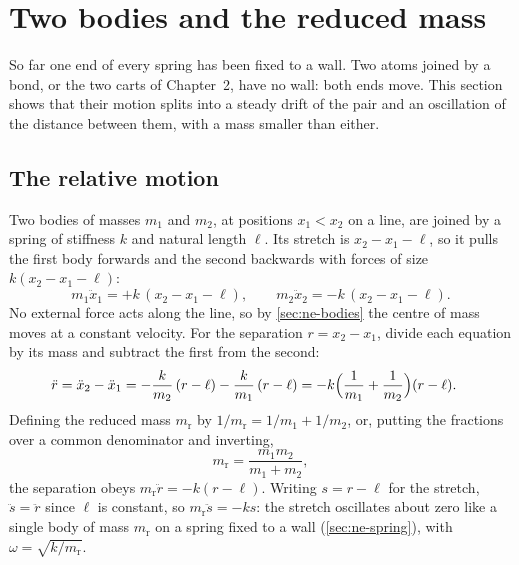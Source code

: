 \section{Two bodies and the reduced mass}
\label{sec:os-bodies}

So far one end of every spring has been fixed to a wall. Two atoms joined
by a bond, or the two carts of Chapter~2, have no wall: both ends move.
This section shows that their motion splits into a steady drift of the
pair and an oscillation of the distance between them, with a mass smaller
than either.

\subsection*{The relative motion}

Two bodies of masses $m_1$ and $m_2$, at positions $x_1 < x_2$ on a line,
are joined by a spring of stiffness $k$ and natural length $\ell$. Its
stretch is $x_2 - x_1 - \ell$, so it pulls the first body forwards and the
second backwards with forces of size $k(x_2 - x_1 - \ell)$:
\begin{equation*}
   m_1\ddot{x}_1 = +k\,(x_2 - x_1 - \ell) , \qquad
   m_2\ddot{x}_2 = -k\,(x_2 - x_1 - \ell) .
\end{equation*}
No external force acts along the line, so by \cref{sec:ne-bodies} the
centre of mass moves at a constant velocity. For the separation $r = x_2 -
x_1$, divide each equation by its mass and subtract the first from the
second:
\begin{align*}
   \ddot{r} = \ddot{x}_2 - \ddot{x}_1
   &= -\frac{k}{m_2}\,(r - \ell) - \frac{k}{m_1}\,(r - \ell)
   = -k\Bigl(\frac{1}{m_1} + \frac{1}{m_2}\Bigr)(r - \ell) .
\end{align*}
Defining the reduced mass $m_{\mathrm r}$ by $1/m_{\mathrm r} = 1/m_1 + 1/m_2$, or, putting the
fractions over a common denominator and inverting,
\begin{equation}
   m_{\mathrm r} = \frac{m_1 m_2}{m_1 + m_2} ,
   \label{eq:os-reduced}
\end{equation}
the separation obeys $m_{\mathrm r}\ddot{r} = -k(r - \ell)$. Writing $s =
r - \ell$ for the stretch, $\ddot{s} = \ddot{r}$ since $\ell$ is constant,
so $m_{\mathrm r}\ddot{s} = -ks$: the stretch oscillates about zero like a
single body of mass $m_{\mathrm r}$ on a spring fixed to a wall
(\cref{sec:ne-spring}), with $\omega = \sqrt{k/m_{\mathrm r}}$.

